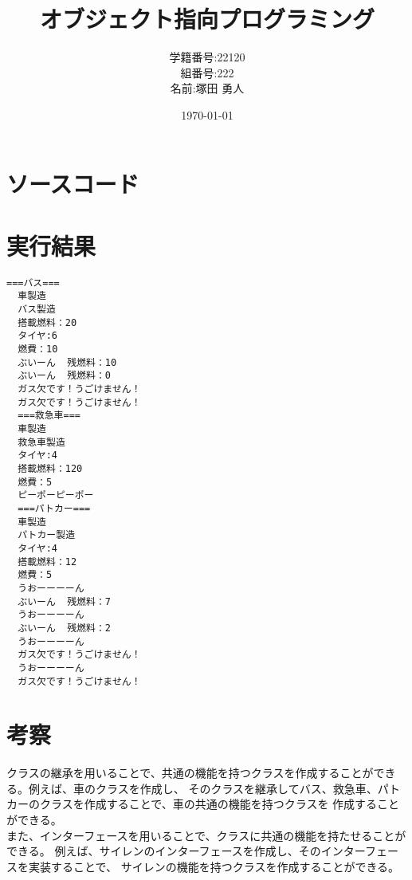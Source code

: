\documentclass[a4j]{jarticle}
\begin{document}
\title{オブジェクト指向プログラミング}
\author{学籍番号:22120 \\ 組番号:222 \\名前:塚田 勇人}
\date{\today}
\maketitle

\section{ソースコード}







\section{実行結果}
\begin{lstlisting}[caption=実行結果,label=src:result]
  ===バス===
  車製造
  バス製造
  搭載燃料：20
  タイヤ:6
  燃費：10
  ぶいーん  残燃料：10
  ぶいーん  残燃料：0
  ガス欠です！うごけません！
  ガス欠です！うごけません！
  ===救急車===
  車製造
  救急車製造
  タイヤ:4
  搭載燃料：120
  燃費：5
  ピーポーピーポー
  ===パトカー===
  車製造
  パトカー製造
  タイヤ:4
  搭載燃料：12
  燃費：5
  うおーーーーん
  ぶいーん  残燃料：7
  うおーーーーん
  ぶいーん  残燃料：2
  うおーーーーん
  ガス欠です！うごけません！
  うおーーーーん
  ガス欠です！うごけません！
\end{lstlisting}

\section{考察}
クラスの継承を用いることで、共通の機能を持つクラスを作成することができる。例えば、車のクラスを作成し、
そのクラスを継承してバス、救急車、パトカーのクラスを作成することで、車の共通の機能を持つクラスを
作成することができる。\\
また、インターフェースを用いることで、クラスに共通の機能を持たせることができる。
例えば、サイレンのインターフェースを作成し、そのインターフェースを実装することで、
サイレンの機能を持つクラスを作成することができる。
\end{document}
